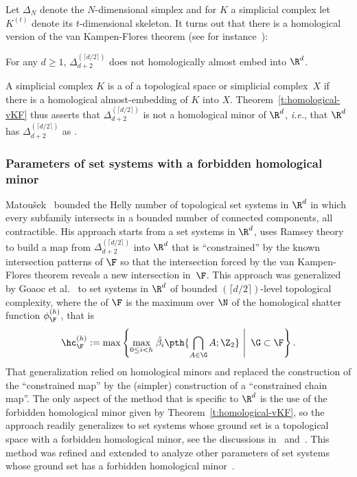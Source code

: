%
\medskip
%
Let $\Delta_N$ denote the $N$-dimensional simplex and for $K$ a simplicial complex let $K^{(t)}$ denote its $t$-dimensional skeleton. It turns out that there is a homological version of the van Kampen-Flores theorem (see for instance~\cite[Corollary~14]{hellyBetti}):
%
\begin{theorem}
  \label{t:homological-vKF}
  For any $d \ge 1$, $\Delta_{d+2}^{(\lceil d/2 \rceil)}$ does not homologically almost embed into $\R^d$.
\end{theorem}
%
\noindent
A simplicial complex $K$ is a  of a topological space or simplicial complex~$X$ if there is a homological almost-embedding of $K$ into $X$. Theorem~\ref{t:homological-vKF} thus asserts that $\Delta_{d+2}^{(\lceil d/2 \rceil)}$ is not a homological minor of $\R^{d}$, \emph{i.e.}, that $\R^{d}$ has $\Delta_{d+2}^{(\lceil d/2 \rceil)}$ as . 
%
%
\subsubsection{Parameters of set systems with a forbidden homological minor}
%
Matou\v sek~\cite{m-httucs-97} bounded the Helly number of topological set systems in $\R^d$ in which every subfamily intersects in a bounded number of connected components, all contractible. His approach starts from a set systems in $\R^d$, uses Ramsey theory to build a map from $\Delta_{d+2}^{(\lceil d/2 \rceil)}$  into $\R^d$ that is ``constrained'' by the known intersection patterns of $\F$ so that the intersection forced by the van Kampen-Flores theorem reveals a new intersection in~$\F$.
%
\medskip
%
This approach was generalized by Goaoc et al.~\cite{hellyBetti} to set systems in $\R^d$ of bounded $(\lceil d/2 \rceil)$-level topological complexity, where the  of $\F$ is the maximum over $\N$ of the homological shatter function $\phi_{\F}^{(h)}$, that is
%
\begin{equation}\label{eq:topcomp}
  \hc_\F^{(h)} := \max\left\{\max_{0 \le i < h}\left.\tilde{\beta_i}\pth{\bigcap\limits_{A\in \G} A;\Z_2} \ \right| \ \G\subset \F\right\}.
\end{equation}
%
\noindent
That generalization relied on homological minors and replaced the construction of the ``constrained map'' by the (simpler) construction of a ``constrained chain map''. The only aspect of the method that is specific to $\R^d$ is the use of the forbidden homological minor given by Theorem~\ref{t:homological-vKF}, so the approach readily generalizes to set systems whose ground set is a topological space with a forbidden homological minor, see the discussions in~\cite[$\mathsection 5.2$]{patakova2022bounding} and~\cite[$\mathsection 2.2$]{steppingUp}. This method was refined and extended to analyze other parameters of set systems whose ground set has a forbidden homological minor~\cite{patakova2022bounding,patak2025sharper,steppingUp}.
%
%
